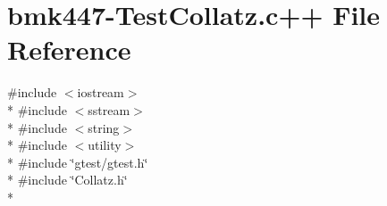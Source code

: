 \hypertarget{bmk447-TestCollatz_8c_09_09}{\section{bmk447-\/\-Test\-Collatz.c++ File Reference}
\label{bmk447-TestCollatz_8c_09_09}
}
{\ttfamily \#include $<$iostream$>$}\\*
{\ttfamily \#include $<$sstream$>$}\\*
{\ttfamily \#include $<$string$>$}\\*
{\ttfamily \#include $<$utility$>$}\\*
{\ttfamily \#include \char`\"{}gtest/gtest.\-h\char`\"{}}\\*
{\ttfamily \#include \char`\"{}Collatz.\-h\char`\"{}}\\*

